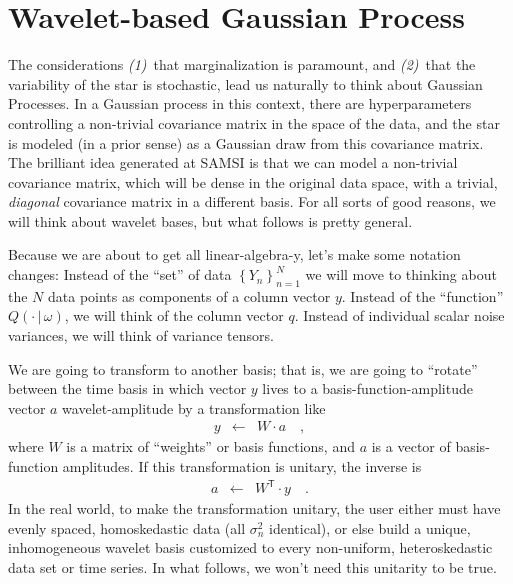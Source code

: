 \documentclass[12pt,letterpaper]{article}
\newcommand{\given}{\,|\,}
\newcommand{\setof}[1]{\left\{{#1}\right\}}
\newcommand{\transpose}[1]{{#1}^{\mathsf{T}}}
\newcommand{\datum}{Y}
\newcommand{\data}{\setof{\datum_n}_{n=1}^N}
\newcommand{\datavec}{y}
\newcommand{\exofn}{Q}
\newcommand{\exovec}{q}
\newcommand{\exopars}{\omega}
\newcommand{\variance}{\sigma^2}
\newcommand{\wavevec}{a}
\newcommand{\weightmatrix}{W}
\begin{document}
\section{Wavelet-based Gaussian Process}

The considerations \textsl{(1)}~that marginalization is paramount,
and \textsl{(2)}~that the variability of the star is stochastic,
lead us naturally to think about Gaussian Processes.
In a Gaussian process in this context,
there are hyperparameters controlling a non-trivial covariance matrix in the space of the data,
and the star is modeled (in a prior sense) as a Gaussian draw from this covariance matrix.
The brilliant idea generated at SAMSI is that we can model a non-trivial covariance matrix,
which will be dense in the original data space,
with a trivial, \emph{diagonal} covariance matrix in a different basis.
For all sorts of good reasons, we will think about wavelet bases,
but what follows is pretty general.

Because we are about to get all linear-algebra-y, let's make some
notation changes: Instead of the ``set'' of data $\data$ we will move
to thinking about the $N$ data points as components of a column vector
$\datavec$.  Instead of the ``function'' $\exofn(\cdot\given\exopars)$,
we will think of the column vector $\exovec$.
Instead of individual scalar noise variances,
we will think of variance tensors.

We are going to transform to another basis;
that is, we are going to ``rotate'' between the time basis in which vector $y$ lives
to a basis-function-amplitude vector $\wavevec$ wavelet-amplitude by a transformation like
\begin{eqnarray}
\datavec
  &\leftarrow& \weightmatrix\cdot\wavevec
\quad ,
\end{eqnarray}
where $\weightmatrix$ is a matrix of ``weights'' or basis functions,
and $\wavevec$ is a vector of basis-function amplitudes.
If this transformation is unitary, the inverse is
\begin{eqnarray}
\wavevec
  &\leftarrow& \transpose{\weightmatrix}\cdot\datavec
\quad .
\end{eqnarray}
In the real world, to make the transformation unitary,
the user either must have evenly spaced, homoskedastic data (all $\variance_n$ identical),
or else build a unique, inhomogeneous wavelet basis
customized to every non-uniform, heteroskedastic data set or time series.
In what follows, we won't need this unitarity to be true.
\end{document}
